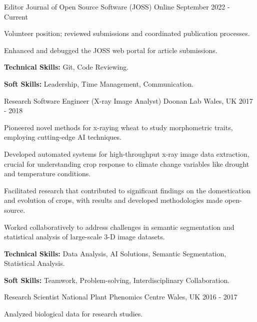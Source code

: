 \begin{cventries}
  \cventry
    {Editor} %
    {Journal of Open Source Software (JOSS)} %
    {Online} %
    {September 2022 - Current} %
    {
      \begin{cvitems}
        \item {Volunteer position; reviewed submissions and coordinated publication processes.}
        \item {Enhanced and debugged the JOSS web portal for article submissions.}
        \item {\textbf{Technical Skills:} Git, Code Reviewing.}
        \item {\textbf{Soft Skills:} Leadership, Time Management, Communication.}
      \end{cvitems}
    }

    \cventry
    {Research Software Engineer (X-ray Image Analyst)} %
    {Doonan Lab} %
    {Wales, UK} %
    {2017 - 2018 } %
    {
      \begin{cvitems}
        \item {Pioneered novel methods for x-raying wheat to study morphometric traits, employing cutting-edge AI techniques.}
        \item {Developed automated systems for high-throughput x-ray image data extraction, crucial for understanding crop response to climate change variables like drought and temperature conditions.}
        \item {Facilitated research that contributed to significant findings on the domestication and evolution of crops, with results and developed methodologies made open-source.}
        \item {Worked collaboratively to address challenges in semantic segmentation and statistical analysis of large-scale 3-D image datasets.}
        \item {\textbf{Technical Skills:} Data Analysis, AI Solutions, Semantic Segmentation, Statistical Analysis.}
        \item {\textbf{Soft Skills:} Teamwork, Problem-solving, Interdisciplinary Collaboration.}
      \end{cvitems}
    }


  \cventry
    {Research Scientist} %
    {National Plant Phenomics Centre} %
    {Wales, UK} %
    {2016 - 2017 } %
    {
      \begin{cvitems}
        \item {Analyzed biological data for research studies.}
      \end{cvitems}
    }


\end{cventries}
